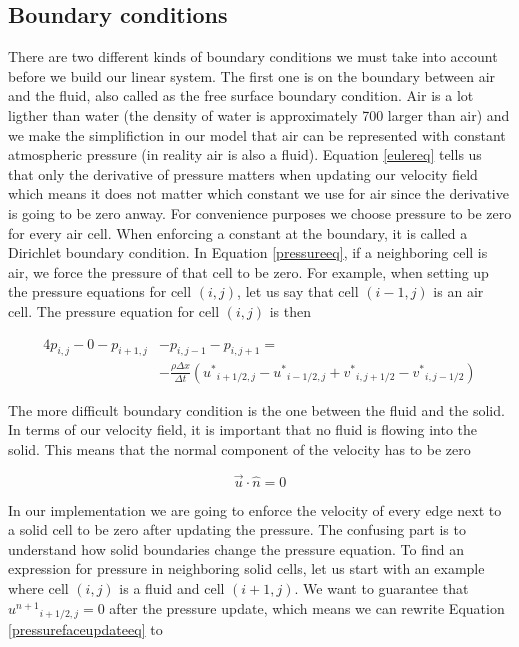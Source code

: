 \subsection{Boundary conditions}

There are two different kinds of boundary conditions we must take into account before we build our linear system. The first one is on the boundary between air and the fluid, also called as the free surface boundary condition. Air is a lot ligther than water (the density of water is approximately 700 larger than air) and we make the simplifiction in our model that air can be represented with constant atmospheric pressure (in reality air is also a fluid). Equation \ref{eulereq} tells us that only the derivative of pressure matters when updating our velocity field which means it does not matter which constant we use for air since the derivative is going to be zero anway. For convenience purposes we choose pressure to be zero for every air cell. When enforcing a constant at the boundary, it is called a Dirichlet boundary condition. In Equation \ref{pressureeq}, if a neighboring cell is air, we force the pressure of that cell to be zero. For example, when setting up the pressure equations for cell $(i,j)$, let us say that cell $(i-1, j)$ is an air cell. The pressure equation for cell $(i,j)$ is then

\begin{equation}
\begin{split}
4p_{i,j} - 0 - p_{i+1,j} & - p_{i,j-1} - p_{i,j+1} = \\ &-\frac{\rho \Delta x}{\Delta t}({u^*}_{i+1/2,j} - {u^*}_{i-1/2,j} + {v^*}_{i,j+1/2} - {v^*}_{i,j-1/2})
\end{split}
\label{dirichleteq}
\end{equation}

The more difficult boundary condition is the one between the fluid and the solid. In terms of our velocity field, it is important that no fluid is flowing into the solid. This means that the normal component of the velocity has to be zero

\begin{equation}
\vec{u} \cdot \hat{n} = 0
\end{equation}

In our implementation we are going to enforce the velocity of every edge next to a solid cell to be zero after updating the pressure. The confusing part is to understand how solid boundaries change the pressure equation. To find an expression for pressure in neighboring solid cells, let us start with an example where cell $(i,j)$ is a fluid and cell $(i+1,j)$. We want to guarantee that ${u^{n+1}}_{i+1/2,j} = 0$ after the pressure update, which means we can rewrite Equation \ref{pressurefaceupdateeq} to

